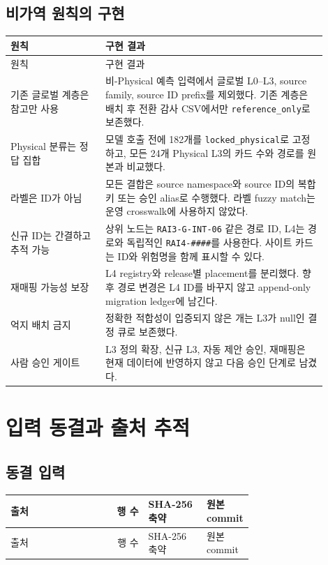 \documentclass[11pt,a4paper]{article}
\newcommand{\code}[1]{\texttt{#1}}
\begin{document}
\subsection{비가역 원칙의 구현}

\begin{longtable}{L{0.27\linewidth}L{0.63\linewidth}}
\toprule
원칙 & 구현 결과 \\
\midrule
\endfirsthead
\toprule
원칙 & 구현 결과 \\
\midrule
\endhead
기존 글로벌 계층은 참고만 사용 & 비-Physical 예측 입력에서 글로벌 L0--L3, source family, source ID prefix를 제외했다. 기존 계층은 배치 후 전환 감사 CSV에서만 \code{reference\_only}로 보존했다. \\
Physical 분류는 정답 집합 & 모델 호출 전에 182개를 \code{locked\_physical}로 고정하고, 모든 24개 Physical L3의 카드 수와 경로를 원본과 비교했다. \\
라벨은 ID가 아님 & 모든 결합은 source namespace와 source ID의 복합키 또는 승인 alias로 수행했다. 라벨 fuzzy match는 운영 crosswalk에 사용하지 않았다. \\
신규 ID는 간결하고 추적 가능 & 상위 노드는 \code{RAI3-G-INT-06} 같은 경로 ID, L4는 경로와 독립적인 \code{RAI4-\#\#\#\#}를 사용한다. 사이트 카드는 ID와 위험명을 함께 표시할 수 있다. \\
재매핑 가능성 보장 & L4 registry와 release별 placement를 분리했다. 향후 경로 변경은 L4 ID를 바꾸지 않고 append-only migration ledger에 남긴다. \\
억지 배치 금지 & 정확한 적합성이 입증되지 않은 \NeedsDecision{}개는 L3가 null인 결정 큐로 보존했다. \\
사람 승인 게이트 & L3 정의 확장, 신규 L3, 자동 제안 승인, 재매핑은 현재 데이터에 반영하지 않고 다음 승인 단계로 남겼다. \\
\bottomrule
\end{longtable}

\section{입력 동결과 출처 추적}

\subsection{동결 입력}

\begin{longtable}{L{0.31\linewidth}rL{0.24\linewidth}L{0.14\linewidth}}
\toprule
출처 & 행 수 & SHA-256 축약 & 원본 commit \\
\midrule
\endfirsthead
\toprule
출처 & 행 수 & SHA-256 축약 & 원본 commit \\
\midrule
\endhead

\end{longtable}
\end{document}
